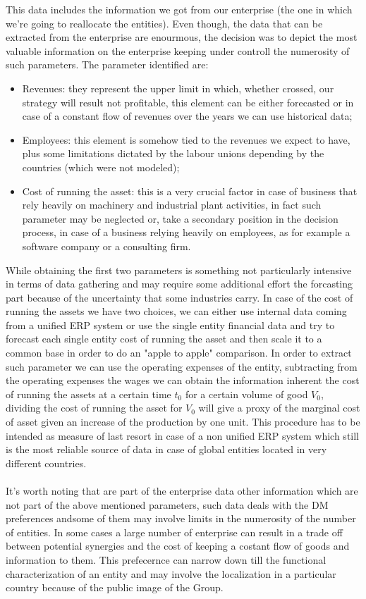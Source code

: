 \documentclass{article}
\begin{document}
This data includes the information we got from our enterprise (the one in which we're going to reallocate the entities). Even though, the data that can be extracted from the enterprise are enourmous, the decision was to depict the most valuable information on the enterprise keeping under controll the numerosity of such parameters. The parameter identified are: 
\begin{itemize}
	\item Revenues: they represent the upper limit in which, whether crossed, our strategy will result not profitable, this element can be either forecasted or in case of a constant flow of revenues over the years we can use historical data;
	\item Employees: this element is somehow tied to the revenues we expect to have, plus some limitations dictated by the labour unions depending by the countries (which were not modeled);
	\item Cost of running the asset: this is a very crucial factor in case of business that rely heavily on machinery and industrial plant activities, in fact such parameter may be neglected or, take a secondary position in the decision process, in case of a business relying heavily on employees, as for example a software company or a consulting firm.
\end{itemize}

While obtaining the first two parameters is something not particularly intensive in terms of data gathering and may require some additional effort the forcasting part because of the uncertainty that some industries carry. In case of the cost of running the assets we have two choices, we can either use internal data coming from a unified ERP system or use the single entity financial data and try to forecast each single entity cost of running the asset and then scale it to a common base in order to do an "apple to apple" comparison. In order to extract such parameter we can use the operating expenses of the entity\cite{williams_financial_2008}, subtracting from the operating expenses the wages we can obtain the information inherent the cost of running the assets at a certain time $t_0$ for a certain volume of good $V_0$, dividing the cost of running the asset for $V_0$ will give a proxy of the marginal cost of asset given an increase of the production by one unit. This procedure has to be intended as measure of last resort in case of a non unified ERP system which still is the most reliable source of data in case of global entities located in very different countries. 
\\
\\
It's worth noting that are part of the enterprise data other information which are not part of the above mentioned parameters, such data deals with the DM preferences andsome of them may involve limits in the numerosity of the number of entities. In some cases a large number of enterprise can result in a trade off between potential synergies and the cost of keeping a costant flow of goods and information to them. This prefecernce can narrow down till the functional characterization of an entity and may involve the localization in a particular country because of the public image of the Group.
\end{document}
